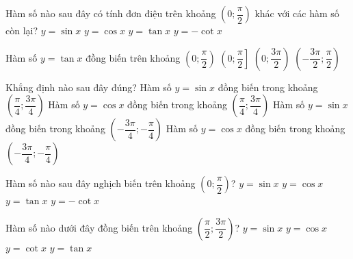 \begin{ex}%
	Hàm số nào sau đây có tính đơn điệu trên khoảng $\left(0;\dfrac{\pi}{2}\right)$ khác với các hàm số còn lại?
	\choice
	{$y=\sin x$}
	{\True $y=\cos x$}
	{$y=\tan x$}
	{$y=-\cot x$}
\end{ex}
\begin{ex}%
	Hàm số $y=\tan x$ đồng biến trên khoảng
	\choice
	{\True $\left(0;\dfrac{\pi}{2}\right)$}
	{$\left(0;\dfrac{\pi}{2}\right]$}
	{$\left(0;\dfrac{3\pi}{2}\right)$}
	{$\left(-\dfrac{3\pi}{2};\dfrac{\pi}{2}\right)$}
\end{ex}
\begin{ex}%
	Khẳng định nào sau đây đúng?
	\choice
	{Hàm số $y=\sin x$ đồng biến trong khoảng $\left(\dfrac{\pi}{4};\dfrac{3\pi}{4}\right)$}
	{Hàm số $y=\cos x$ đồng biến trong khoảng $\left(\dfrac{\pi}{4};\dfrac{3\pi}{4}\right)$}
	{Hàm số $y=\sin x$ đồng biến trong khoảng $\left(-\dfrac{3\pi}{4};-\dfrac{\pi}{4}\right)$}
	{\True Hàm số $y=\cos x$ đồng biến trong khoảng $\left(-\dfrac{3\pi}{4};-\dfrac{\pi}{4}\right)$}
\end{ex}
\begin{ex}%
	Hàm số nào sau đây nghịch biến trên khoảng $\left(0;\dfrac{\pi}{2}\right)$?
	\choice
	{$y=\sin x$}
	{\True $y=\cos x$}
	{$y=\tan x$}
	{$y=-\cot x$}
\end{ex}
\begin{ex}%
	Hàm số nào dưới đây đồng biến trên khoảng $\left(\dfrac{\pi}{2};\dfrac{3\pi}{2}\right)$?
	\choice
	{$y=\sin x$}
	{$y=\cos x$}
	{$y=\cot x$}
	{\True $y=\tan x$}
\end{ex}
